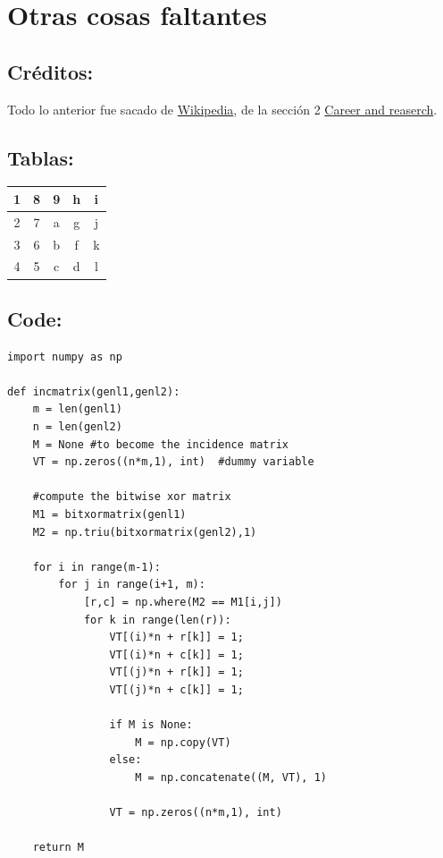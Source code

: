 \documentclass{article}
\begin{document}
\section{Otras cosas faltantes}
  \subsection{Cr\'editos:}
    Todo lo anterior fue sacado de \href{https://en.wikipedia.org/wiki/Alan\_Turing}{Wikipedia}, de
    la secci\'on 2 \href{https://en.wikipedia.org/wiki/Alan\_Turing#Career\_and\_research}{Career and reaserch}.
  \subsection{Tablas:}
    \begin{tabular}{c || c |c | c |c}
      \textbf{1} & \textbf{8} & \textbf{9} & \textbf{h} & \textbf{i} \\ \hline \hline
      2 & 7 & a & g & j \\ \hline
      3 & 6 & b & f & k \\ \hline
      4 & 5 & c & d & l
    \end{tabular}
  \subsection{Code:}

    \begin{lstlisting}
import numpy as np

def incmatrix(genl1,genl2):
    m = len(genl1)
    n = len(genl2)
    M = None #to become the incidence matrix
    VT = np.zeros((n*m,1), int)  #dummy variable

    #compute the bitwise xor matrix
    M1 = bitxormatrix(genl1)
    M2 = np.triu(bitxormatrix(genl2),1)

    for i in range(m-1):
        for j in range(i+1, m):
            [r,c] = np.where(M2 == M1[i,j])
            for k in range(len(r)):
                VT[(i)*n + r[k]] = 1;
                VT[(i)*n + c[k]] = 1;
                VT[(j)*n + r[k]] = 1;
                VT[(j)*n + c[k]] = 1;

                if M is None:
                    M = np.copy(VT)
                else:
                    M = np.concatenate((M, VT), 1)

                VT = np.zeros((n*m,1), int)

    return M
    \end{lstlisting}
\end{document}
